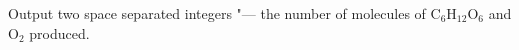 Output two space separated integers "--- the number of molecules of $\text{C}_6\text{H}_{12}\text{O}_6$ and $\text{O}_2$ produced.

